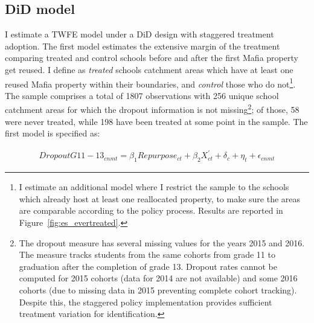\documentclass[12pt]{article}
\theoremstyle{plain}
\theoremstyle{plain}
\theoremstyle{plain}
\theoremstyle{definition}
\theoremstyle{plain}
\theoremstyle{definition}
\theoremstyle{plain}
\theoremstyle{remark}
\theoremstyle{definition}
\theoremstyle{definition}
\theoremstyle{plain}
\begin{document}
 \subsection{DiD model}
\label{sec:jmp_did_model}
 I estimate a TWFE model under a DiD design with staggered treatment adoption. The first model estimates the extensive margin of the treatment comparing treated and control schools before and after the first Mafia property get reused. I define as \emph{treated} schools catchment areas which have at least one reused Mafia property within their boundaries, and \emph{control} those who do not\footnote{I estimate an additional model where I restrict the sample to the schools which already host at least one reallocated property, to make sure the areas are comparable according to the policy process. Results are reported in Figure~\ref{fig:es_evertreated}.}. The sample comprises a total of 1807 observations with 256 unique school catchment areas for which the dropout information is not missing\footnote{The dropout measure has several missing values for the years 2015 and 2016. The measure tracks students from the same cohorts from grade 11 to graduation after the completion of grade 13. Dropout rates cannot be computed for 2015 cohorts (data for 2014 are not available) and some 2016 cohorts (due to missing data in 2015 preventing complete cohort tracking). Despite this, the staggered policy implementation provides sufficient treatment variation for identification.}; of those, 58 were never treated, while 198 have been treated at some point in the sample. The first model is specified as: \par
\begin{center}
          \begin{equation} \label{1stspec}
        \begin{split}
 Dropout{G11-13_{cnmt}} = \beta_1Repurpose_{ct} +\beta_2X^{'}_{ct}  +\delta_c  + \eta_{t} + \epsilon_{cnmt}
         \end{split}
      \end{equation}
\end{center}
\vspace{0.4cm}
\end{document}

